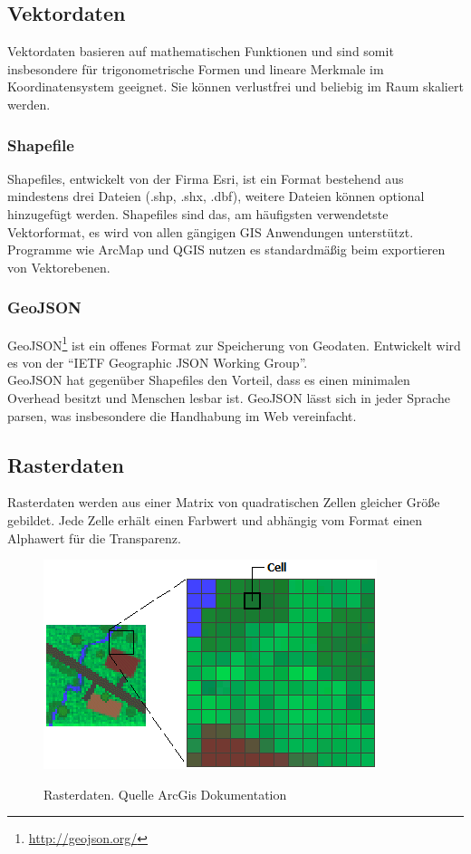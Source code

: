 \documentclass[10pt,conference,compsocconf]{IEEEtran}
\begin{document}
\subsection{Vektordaten}
Vektordaten basieren auf mathematischen Funktionen und sind somit insbesondere für trigonometrische Formen und lineare Merkmale im Koordinatensystem geeignet. Sie können verlustfrei und beliebig im Raum skaliert werden.\\

\subsubsection{Shapefile}
Shapefiles, entwickelt von der Firma Esri, ist ein Format bestehend aus mindestens drei Dateien (.shp, .shx, .dbf), weitere Dateien können optional hinzugefügt werden. Shapefiles sind das, am häufigsten verwendetste Vektorformat, es wird von allen gängigen GIS Anwendungen unterstützt. Programme wie ArcMap und QGIS nutzen es standardmäßig beim exportieren von Vektorebenen.\\

\subsubsection{GeoJSON}
GeoJSON\footnote{\url{http://geojson.org/}} ist ein offenes Format zur Speicherung von Geodaten. Entwickelt wird es von der \enquote{IETF Geographic JSON Working Group}. \\
GeoJSON hat gegenüber Shapefiles den Vorteil, dass es einen minimalen Overhead besitzt und Menschen lesbar ist. GeoJSON lässt sich in jeder Sprache parsen, was insbesondere die Handhabung im Web vereinfacht.\\


\subsection{Rasterdaten}
Rasterdaten werden aus einer Matrix von quadratischen Zellen gleicher Größe gebildet. Jede Zelle erhält einen Farbwert und abhängig vom Format einen Alphawert für die Transparenz. \\
\begin{figure}[H]
	\centering
	\includegraphics[width=0.75\columnwidth]{img/rasterdaten}\\
	\caption[]{Rasterdaten. Quelle ArcGis Dokumentation\footnotemark}
	\label{img:rasterdaten}
\end{figure}
\end{document}
